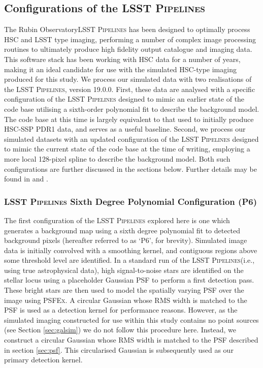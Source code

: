 \documentclass[fleqn,usenatbib,useAMS]{mnras}
\newcommand*{\PSFEx}{\textsc{PSFEx}\xspace}
\newcommand*{\LSSTPs}{\textsc{LSST Pipelines}\xspace}
\newcommand*{\DMA}{\textsc{P6}\xspace}
\newcommand*{\RO}{Rubin Observatory\xspace}
\begin{document}
\subsection{Configurations of the \LSSTPs}
\label{sec:dmstack}

The \RO \LSSTPs has been designed to optimally process HSC and LSST type imaging, performing a number of complex image processing routines to ultimately produce high fidelity output catalogue and imaging data. This software stack has been working with HSC data for a number of years, making it an ideal candidate for use with the simulated HSC-type imaging produced for this study. We process our simulated data with two realisations of the \LSSTPs, version 19.0.0. First, these data are analysed with a specific configuration of the \LSSTPs designed to mimic an earlier state of the code base utilising a sixth-order polynomial fit to describe the background model. The code base at this time is largely equivalent to that used to initially produce HSC-SSP PDR1 data, and serves as a useful baseline. Second, we process our simulated datasets with an updated configuration of the \LSSTPs designed to mimic the current state of the code base at the time of writing, employing a more local 128-pixel spline to describe the background model. Both such configurations are further discussed in the sections below. Further details may be found in \citet{Bosch2018} and \citet{Bosch2019}.

\subsubsection{\LSSTPs Sixth Degree Polynomial Configuration (\DMA)}
\label{sec:dmstack2018}

The first configuration of the \LSSTPs explored here is one which generates a background map using a sixth degree polynomial fit to detected background pixels (hereafter referred to as `\DMA', for brevity). Simulated image data is initially convolved with a smoothing kernel, and contiguous regions above some threshold level are identified. In a standard run of the \LSSTPs (i.e., using true astrophysical data), high signal-to-noise stars are identified on the stellar locus using a placeholder Gaussian PSF to perform a first detection pass. These bright stars are then used to model the spatially varying PSF over the image using \PSFEx. A circular Gaussian whose RMS width is matched to the PSF is used as a detection kernel for performance reasons. However, as the simulated imaging constructed for use within this study contains no point sources (see Section \ref{sec:galsim}) we do not follow this procedure here. Instead, we construct a circular Gaussian whose RMS width is matched to the PSF described in section \ref{sec:psf}. This circularised Gaussian is subsequently used as our primary detection kernel. 
\end{document}
